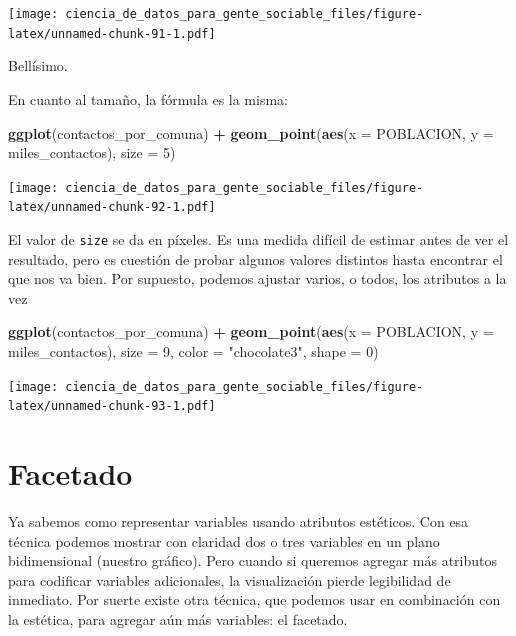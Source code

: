 \documentclass[]{book}
\newenvironment{Shaded}{\begin{snugshade}}{\end{snugshade}}
\newcommand{\KeywordTok}[1]{\textcolor[rgb]{0.13,0.29,0.53}{\textbf{#1}}}
\newcommand{\DataTypeTok}[1]{\textcolor[rgb]{0.13,0.29,0.53}{#1}}
\newcommand{\DecValTok}[1]{\textcolor[rgb]{0.00,0.00,0.81}{#1}}
\newcommand{\StringTok}[1]{\textcolor[rgb]{0.31,0.60,0.02}{#1}}
\newcommand{\OperatorTok}[1]{\textcolor[rgb]{0.81,0.36,0.00}{\textbf{#1}}}
\newcommand{\NormalTok}[1]{#1}
\begin{document}
\texttt{[image: ciencia\_de\_datos\_para\_gente\_sociable\_files/figure-latex/unnamed-chunk-91-1.pdf]}

Bellísimo.

En cuanto al tamaño, la fórmula es la misma:

\begin{Shaded}
\begin{Highlighting}[]
\KeywordTok{ggplot}\NormalTok{(contactos_por_comuna) }\OperatorTok{+}\StringTok{ }
\StringTok{    }\KeywordTok{geom_point}\NormalTok{(}\KeywordTok{aes}\NormalTok{(}\DataTypeTok{x =}\NormalTok{ POBLACION, }\DataTypeTok{y =}\NormalTok{ miles_contactos), }\DataTypeTok{size =} \DecValTok{5}\NormalTok{)}
\end{Highlighting}
\end{Shaded}

\texttt{[image: ciencia\_de\_datos\_para\_gente\_sociable\_files/figure-latex/unnamed-chunk-92-1.pdf]}

El valor de \texttt{size} se da en píxeles. Es una medida difícil de
estimar antes de ver el resultado, pero es cuestión de probar algunos
valores distintos hasta encontrar el que nos va bien. Por supuesto,
podemos ajustar varios, o todos, los atributos a la vez

\begin{Shaded}
\begin{Highlighting}[]
\KeywordTok{ggplot}\NormalTok{(contactos_por_comuna) }\OperatorTok{+}\StringTok{ }
\StringTok{    }\KeywordTok{geom_point}\NormalTok{(}\KeywordTok{aes}\NormalTok{(}\DataTypeTok{x =}\NormalTok{ POBLACION, }\DataTypeTok{y =}\NormalTok{ miles_contactos), }
               \DataTypeTok{size =} \DecValTok{9}\NormalTok{, }\DataTypeTok{color =} \StringTok{"chocolate3"}\NormalTok{, }\DataTypeTok{shape =} \DecValTok{0}\NormalTok{)}
\end{Highlighting}
\end{Shaded}

\texttt{[image: ciencia\_de\_datos\_para\_gente\_sociable\_files/figure-latex/unnamed-chunk-93-1.pdf]}

\section{Facetado}\label{facetado}

Ya sabemos como representar variables usando atributos estéticos. Con
esa técnica podemos mostrar con claridad dos o tres variables en un
plano bidimensional (nuestro gráfico). Pero cuando si queremos agregar
más atributos para codificar variables adicionales, la visualización
pierde legibilidad de inmediato. Por suerte existe otra técnica, que
podemos usar en combinación con la estética, para agregar aún más
variables: el facetado.
\end{document}
